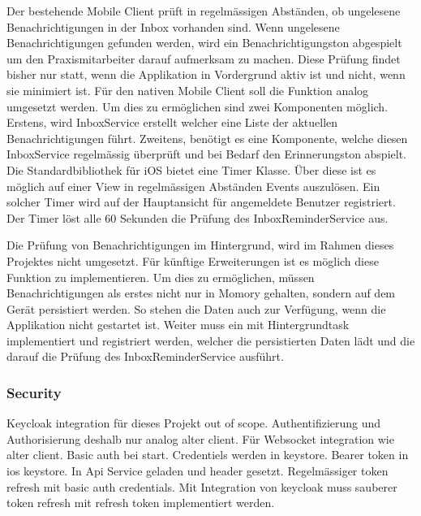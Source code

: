 Der bestehende Mobile Client prüft in regelmässigen Abständen, ob ungelesene Benachrichtigungen in der Inbox vorhanden sind.
Wenn ungelesene Benachrichtigungen gefunden werden, wird ein Benachrichtigungston abgespielt um den Praxismitarbeiter darauf aufmerksam zu machen.
Diese Prüfung findet bisher nur statt, wenn die Applikation in Vordergrund aktiv ist und nicht, wenn sie minimiert ist.
Für den nativen Mobile Client soll die Funktion analog umgesetzt werden.
Um dies zu ermöglichen sind zwei Komponenten möglich.
Erstens, wird InboxService erstellt welcher eine Liste der aktuellen Benachrichtigungen führt.
Zweitens, benötigt es eine Komponente, welche diesen InboxService regelmässig überprüft und bei Bedarf den Erinnerungston abspielt.
Die Standardbibliothek für iOS bietet eine Timer Klasse.
Über diese ist es möglich auf einer View in regelmässigen Abständen Events auszulösen.\cite{ios_timer}
Ein solcher Timer wird auf der Hauptansicht für angemeldete Benutzer registriert.
Der Timer löst alle 60 Sekunden die Prüfung des InboxReminderService aus.

Die Prüfung von Benachrichtigungen im Hintergrund, wird im Rahmen dieses Projektes nicht umgesetzt.
Für künftige Erweiterungen ist es möglich diese Funktion zu implementieren.
Um dies zu ermöglichen, müssen Benachrichtigungen als erstes nicht nur in Momory gehalten, sondern auf dem Gerät persistiert werden.
So stehen die Daten auch zur Verfügung, wenn die Applikation nicht gestartet ist.
Weiter muss ein  mit Hintergrundtask\cite{ios_bgtaskscheduler} implementiert und registriert werden, welcher die persistierten Daten lädt und die darauf die Prüfung des InboxReminderService ausführt.

\subsubsection{Security}

Keycloak integration für dieses Projekt out of scope.
Authentifizierung und Authorisierung deshalb nur analog alter client.
Für Websocket integration wie alter client.
Basic auth bei start.
Credentiels werden in keystore.
Bearer token in ios keystore.
In Api Service geladen und header gesetzt.
Regelmässiger token refresh mit basic auth credentials.
Mit Integration von keycloak muss sauberer token refresh mit refresh token implementiert werden.

\clearpage
